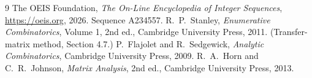 \documentclass[11pt,a4paper]{article}
\theoremstyle{plain}
\theoremstyle{definition}
\begin{document}
\begin{thebibliography}{9}
 The OEIS Foundation, \emph{The On-Line Encyclopedia of Integer
Sequences}, \url{https://oeis.org}, 2026. Sequence A234557.
 R.~P.~Stanley, \emph{Enumerative Combinatorics}, Volume 1, 2nd ed.,
Cambridge University Press, 2011. (Transfer-matrix method, Section 4.7.)
 P.~Flajolet and R.~Sedgewick, \emph{Analytic Combinatorics}, Cambridge
University Press, 2009.
 R.~A.~Horn and C.~R.~Johnson, \emph{Matrix Analysis}, 2nd ed., Cambridge
University Press, 2013.
\end{thebibliography}
\end{document}
